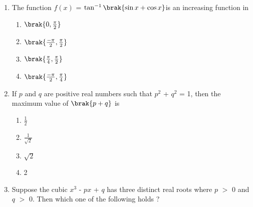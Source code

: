 \documentclass[journal,12pt,onecolumn]{IEEEtran}
\theoremstyle{remark}
\begin{document}
\begin{enumerate}
\begin{multicols}{4}
\begin{enumerate}
        \end{enumerate}
        \end{multicols}
            
        \item The function $f(x)$ = $\tan^{-1}\brak{\sin{x} + \cos{x}}$is an increasing function in \hfill{}
         \begin{multicols}{4}
    
        \begin{enumerate}
        
            
        
      \item $\brak{0,\frac{\pi}{2}}$
        \item $\brak{\frac{-\pi}{2},\frac{\pi}{2}}$
        \item $\brak{\frac{\pi}{4},\frac{\pi}{2}}$
        \item $\brak{\frac{-\pi}{2},\frac{\pi}{4}}$
        
            
        
            
        
        \end{enumerate}
        \end{multicols}
            
        \item If $p$ and $q$ are positive real numbers such that $p^2$ + $q^2$ = 1,     
   then the maximum value of $\brak{p + q}$ is\hfill{}
         \begin{multicols}{4}
        \begin{enumerate}
        
            

        \item $\frac{1}{2}$
        \item $\frac{1}{\sqrt{2}}$
        \item $\sqrt{2}$
        \item 2
        \end{enumerate}
        \end{multicols}
            
        \item Suppose the cubic $x^3$ - $p$$x$ + $q$ has three distinct real roots where $p$ $>$ 0 and $q$ $>$ 0. Then which one of the following holds ? \hfill{}
         
        \begin{enumerate}
        
            
        

\end{enumerate}
\end{enumerate}
\end{document}
